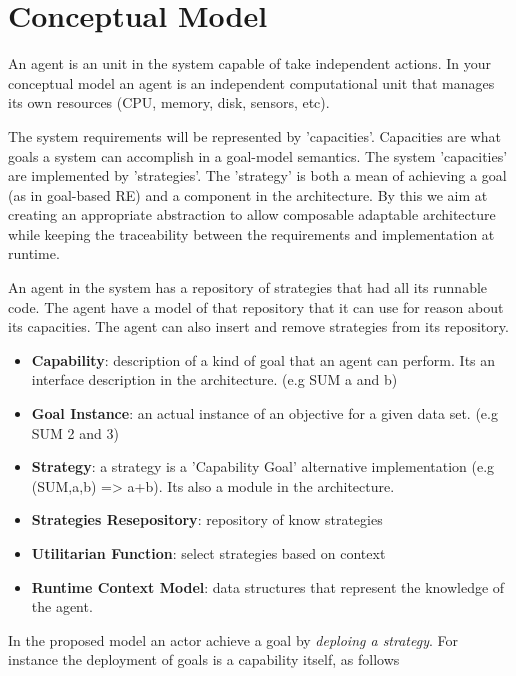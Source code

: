 \section{Conceptual Model}
\label{conceptual_model}

An agent is an unit in the system capable of take independent actions. In your conceptual model an agent is an independent computational unit that manages its own resources (CPU, memory, disk, sensors, etc).

The system requirements will be represented by 'capacities'. Capacities are what goals a system can accomplish in a goal-model semantics. The system 'capacities' are implemented by 'strategies'.
The 'strategy' is both a mean of achieving a goal (as in goal-based RE) and a component in the architecture. By this we aim at creating an appropriate abstraction to allow composable adaptable architecture while keeping the traceability between the requirements and implementation at runtime.

An agent in the system has a repository of strategies that had all its runnable code. The agent have a model of that repository that it can use for reason about its capacities. The agent can also insert and remove strategies from its repository.


\begin{itemize}
  \item \textbf{Capability}: description of a kind of goal that an agent can perform.   Its an interface description in the architecture. (e.g SUM a and b)
  \item \textbf{Goal Instance}: an actual instance of an objective for a given data set. (e.g SUM 2 and 3)
  \item \textbf{Strategy}: a strategy is a 'Capability Goal' alternative implementation (e.g (SUM,a,b) => {a+b}). Its also a module in the architecture.
  \item \textbf{Strategies Resepository}: repository of know strategies
  \item \textbf{Utilitarian Function}: select strategies based on context
  \item \textbf{Runtime Context Model}: data structures that represent the knowledge of the agent.
\end{itemize}

In the proposed model an actor achieve a goal by \emph{deploing a strategy}. For instance the deployment of goals is a capability itself, as follows

